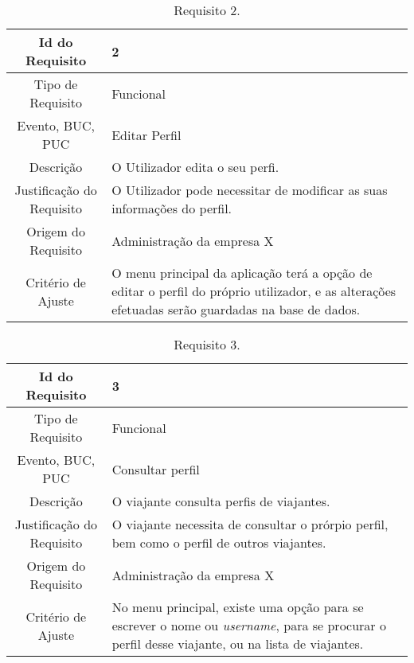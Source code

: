 \begin{table}[H]
\begin{center}
  \begin{tabularx}{\textwidth}{ | c | X | }
    \hline
    Id do Requisito & 2  \\
    
    \hline
    Tipo de Requisito & Funcional \\
    
    \hline
    Evento, BUC, PUC &  Editar Perfil\\
    
    \hline
    Descrição & O Utilizador edita o seu perfi. \\
    
    \hline
    Justificação do Requisito & O Utilizador pode necessitar de modificar as suas informações do perfil.  \\
    
    \hline
    Origem do Requisito & Administração da empresa X \\
    
    \hline
    Critério de Ajuste & O menu principal da aplicação terá a opção de editar o perfil do próprio utilizador, e as alterações efetuadas serão guardadas na base de dados.\\
    
    \hline
  \end{tabularx}
  \caption{Requisito 2.} \label{tab:r3}
\end{center}
\end{table}

\begin{table}[H]
\begin{center}
  \begin{tabularx}{\textwidth}{ | c | X | }
    \hline
    Id do Requisito & 3  \\
    
    \hline
    Tipo de Requisito & Funcional \\
    
    \hline
    Evento, BUC, PUC &  Consultar perfil\\
    
    \hline
    Descrição & O viajante consulta perfis de viajantes. \\
    
    \hline
    Justificação do Requisito & O viajante necessita de consultar o prórpio perfil, bem como o perfil de outros viajantes. \\
    
    \hline
    Origem do Requisito & Administração da empresa X \\
    
    \hline
    Critério de Ajuste & No menu principal, existe uma opção para se escrever o nome ou \emph{username}, para se procurar o perfil desse viajante, ou na lista de viajantes. \\
    
    \hline
  \end{tabularx}
  \caption{Requisito 3.} \label{tab:r3}
\end{center}
\end{table}


